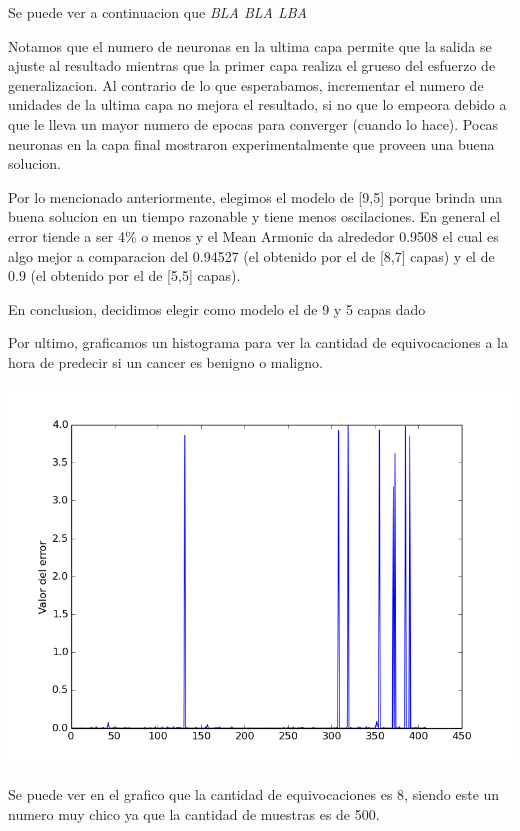 Se puede ver a continuacion que \emph{\color{red} BLA BLA LBA}


Notamos que el numero de neuronas en la ultima capa permite que la salida se ajuste al resultado mientras que la primer capa realiza el grueso del esfuerzo de generalizacion. Al contrario de lo que esperabamos, incrementar el numero de unidades de la ultima capa no mejora el resultado, si no que lo empeora debido a que le lleva un mayor numero de epocas para converger (cuando lo hace). Pocas neuronas en la capa final mostraron experimentalmente que proveen una buena solucion.

Por lo mencionado anteriormente, elegimos el modelo de [9,5] porque brinda una buena solucion en un tiempo razonable y tiene menos oscilaciones. En general el error tiende a ser 4\% o menos y el Mean Armonic da alrededor 0.9508 el cual es algo mejor a comparacion del 0.94527 (el obtenido por el de [8,7] capas) y el de 0.9 (el obtenido por el de [5,5] capas).


En conclusion, decidimos elegir como modelo el de 9 y 5 capas dado 

Por ultimo, graficamos un histograma para ver la cantidad de equivocaciones a la hora de predecir si un cancer es benigno o maligno.

\begin{center}
\includegraphics[scale=0.5]{img/histogramaej155}
\end{center}

Se puede ver en el grafico que la cantidad de equivocaciones es 8, siendo este un numero muy chico ya que la cantidad de muestras es de 500.


